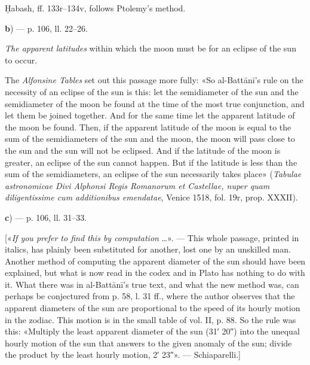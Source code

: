\documentclass[11pt]{article}
\newcommand{\MoonSym}{\text{\MoonFont ☾}}\newcommand{\SunSym}{\text{\MoonFont ⊙}}
\newcommand{\Pg}[1]{\marginpar{\footnotesize\color{gray}#1}}
\begin{document}
\par Ḥabash, ff. 133r–134v, follows Ptolemy's method.\par
\par\begin{center}\textbf{b}) — p. 106, ll. 22–26.\end{center}
\par \emph{The apparent latitudes} within which the moon must be for an eclipse of the sun to occur.\par
\par [These limits of latitude are wholly false in the codex; much better in Plato. For of these limits \[ \text{the greatest} = \text{greatest semidiam.}\ \SunSym + \text{greatest semidiam.}\ \MoonSym = \tfrac{1}{2}\,(33'\,40'' + 35'\,20'') = 34'\,30'' \] \[ \text{the least} = \text{least semidiam.}\ \SunSym + \text{least semidiam.}\ \MoonSym = \tfrac{1}{2}\,(31'\,20'' + 29'\,30'') = 30'\,25''. \] Al-Battānī's diameters of the sun and the moon are on p. 58. — Schiaparelli.]\par
\par The \emph{Alfonsine Tables} set out this passage more fully: «So al-Battānī's rule on the necessity of an eclipse of the sun is this: let the semidiameter of the sun and the semidiameter of the moon be found at the time of the most true conjunction, and let them be joined together. And for the same time let the apparent latitude of the moon be found. Then, if the apparent latitude of the moon is equal to the sum of the semidiameters of the sun and the moon, the moon will pass close to the sun and the sun will not be eclipsed. And if the latitude of the moon is greater, an eclipse of the sun cannot happen. But if the latitude is less than the sum of the semidiameters, an eclipse of the sun necessarily takes place» (\emph{Tabulae astronomicae Divi Alphonsi Regis Romanorum et Castellae, nuper quam diligentissime cum additionibus emendatae}, Venice 1518, fol. 19r, prop. XXXII).\par
\par\begin{center}\textbf{c}) — p. 106, ll. 31–33.\end{center}
\par \Pg{I 282}[«\emph{If you prefer to find this by computation} …». — This whole passage, printed in italics, has plainly been substituted for another, lost one by an unskilled man. Another method of computing the apparent diameter of the sun should have been explained, but what is now read in the codex and in Plato has nothing to do with it. What there was in al-Battānī's true text, and what the new method was, can perhaps be conjectured from p. 58, l. 31 ff., where the author observes that the apparent diameters of the sun are proportional to the speed of its hourly motion in the zodiac. This motion is in the small table of vol. II, p. 88. So the rule was this: «Multiply the least apparent diameter of the sun (31′ 20″) into the unequal hourly motion of the sun that answers to the given anomaly of the sun; divide the product by the least hourly motion, 2′ 23″». — Schiaparelli.]\par
\end{document}
